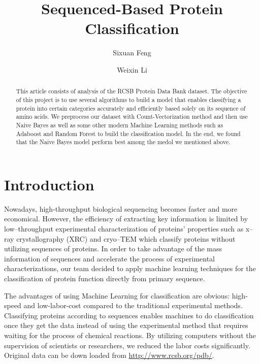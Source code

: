 \documentclass[sigconf]{acmart}
\begin{document}
\title{Sequenced-Based Protein Classification}

\author{Sixuan Feng}

\author{Weixin Li}

\renewcommand{\shortauthors}{Sixuan Feng and Weixin Li.}

\begin{abstract}
This article consists of analysis of the RCSB Protein Data Bank dataset\cite{rose2012rcsb}. The objective of this project is to use several algorithms to build a model  that enables classifying a protein into certain categories accurately and efficiently based solely on its sequence of amino acids. We preprocess our dataset with Count-Vectorization method and then use Naive Bayes as well as some other modern Machine Learning methods such as Adaboost and Random Forest to build the classification model. In the end, we found that the Naive Bayes model perform best among the medol we mentioned above.
\end{abstract}    


\maketitle

\section{Introduction}
Nowadays, high-throughput biological sequencing becomes faster and more economical. However, the efficiency of extracting key information is limited by low--throughput experimental characterization of proteins’ properties such as x--ray crystallography (XRC) and cryo--TEM which classify proteins without utilizing sequences of proteins\cite{rigort2015cryo}. In order to take advantage of the mass information of sequences and accelerate the process of experimental characterizations\cite{lesh1999mining}, our team decided to apply machine learning techniques for the classification\cite{kotsiantis2007supervised} of protein function directly from primary sequence.

The advantages of using Machine Learning for classification are obvious: high-speed and low-labor-cost compared to the traditional experimental methods. Classifying proteins according to sequences enables machines to do classification once they get the data instead of using the experimental method that requires waiting for the process of chemical reactions. By utilizing computers without the supervision of scientists or researchers, we reduced the labor costs significantly. Original data can be down loaded from \url{http://www.rcsb.org/pdb/}.
\end{document}
